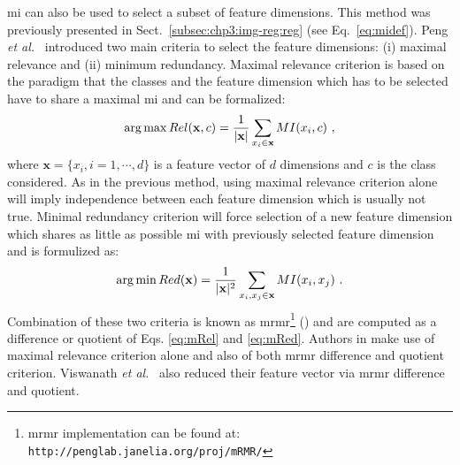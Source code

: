 \Ac{mi} can also be used to select a subset of feature dimensions.
This method was previously presented in Sect.~\ref{subsec:chp3:img-reg:reg} (see Eq.~\eqref{eq:midef}).
Peng \textit{et al.}~\cite{Peng2005} introduced two main criteria to select the feature dimensions: (i) maximal relevance and (ii) minimum redundancy.
Maximal relevance criterion is based on the paradigm that the classes and the feature dimension which has to be selected have to share a maximal \ac{mi} and can be formalized:
\begin{equation}
	\operatorname*{arg\,max} Rel(\mathbf{x},c) = \frac{1}{|\mathbf{x}|} \sum_{x_i \in \mathbf{x}} MI(x_i,c)  \ , 
	\label{eq:mRel}
\end{equation}
\noindent where $\mathbf{x} = \{x_i,i=1,\cdots,d\}$ is a feature vector of $d$ dimensions and $c$ is the class considered.
As in the previous method, using maximal relevance criterion alone will imply independence between each feature dimension which is usually not true.
Minimal redundancy criterion will force selection of a new feature dimension which shares as little as possible \ac{mi} with previously selected feature dimension and is formulized as:
\begin{equation}
	\operatorname*{arg\,min} Red(\mathbf{x}) = \frac{1}{|\mathbf{x}|^2} \sum_{x_i,x_j \in \mathbf{x}} MI(x_i,x_j)  \ . 
	\label{eq:mRed}
\end{equation}
Combination of these two criteria is known as \ac{mrmr}\footnote{\ac{mrmr} implementation can be found at: \texttt{http://penglab.janelia.\allowbreak org/proj/mRMR/}} (\cite{Peng2005}) and are computed as a difference or quotient of Eqs. \eqref{eq:mRel} and \eqref{eq:mRed}.
Authors in \cite{Niaf2011,Niaf2012} make use of maximal relevance criterion alone and also of both \ac{mrmr} difference and quotient criterion.
Viswanath \textit{et al.}~\cite{Viswanath2012} also reduced their feature vector via \ac{mrmr} difference and quotient.

